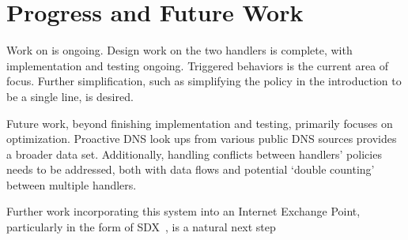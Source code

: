 \section{Progress and Future Work}








Work on \system{} is ongoing. Design work on the two handlers is complete, with implementation and testing ongoing. Triggered behaviors is the current area of focus.  Further simplification, such as simplifying the policy in the introduction to be a single line, is desired.

Future work, beyond finishing implementation and testing, primarily focuses on optimization. Proactive DNS look ups from various public DNS sources provides a broader data set. Additionally, handling conflicts between handlers' policies needs to be addressed, both with data flows and potential `double counting' between multiple handlers.  

Further work incorporating this system into an Internet Exchange Point, particularly in the form of SDX~\cite{sdx}, is a natural next step

